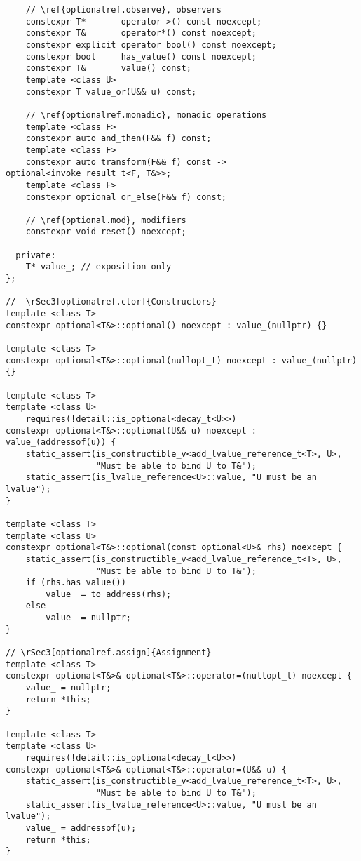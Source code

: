 \documentclass[a4paper,10pt,oneside,openany,final,article]{memoir}
\begin{document}
\begin{verbatim}
    // \ref{optionalref.observe}, observers
    constexpr T*       operator->() const noexcept;
    constexpr T&       operator*() const noexcept;
    constexpr explicit operator bool() const noexcept;
    constexpr bool     has_value() const noexcept;
    constexpr T&       value() const;
    template <class U>
    constexpr T value_or(U&& u) const;

    // \ref{optionalref.monadic}, monadic operations
    template <class F>
    constexpr auto and_then(F&& f) const;
    template <class F>
    constexpr auto transform(F&& f) const -> optional<invoke_result_t<F, T&>>;
    template <class F>
    constexpr optional or_else(F&& f) const;

    // \ref{optional.mod}, modifiers
    constexpr void reset() noexcept;

  private:
    T* value_; // exposition only
};

//  \rSec3[optionalref.ctor]{Constructors}
template <class T>
constexpr optional<T&>::optional() noexcept : value_(nullptr) {}

template <class T>
constexpr optional<T&>::optional(nullopt_t) noexcept : value_(nullptr) {}

template <class T>
template <class U>
    requires(!detail::is_optional<decay_t<U>>)
constexpr optional<T&>::optional(U&& u) noexcept : value_(addressof(u)) {
    static_assert(is_constructible_v<add_lvalue_reference_t<T>, U>,
                  "Must be able to bind U to T&");
    static_assert(is_lvalue_reference<U>::value, "U must be an lvalue");
}

template <class T>
template <class U>
constexpr optional<T&>::optional(const optional<U>& rhs) noexcept {
    static_assert(is_constructible_v<add_lvalue_reference_t<T>, U>,
                  "Must be able to bind U to T&");
    if (rhs.has_value())
        value_ = to_address(rhs);
    else
        value_ = nullptr;
}

// \rSec3[optionalref.assign]{Assignment}
template <class T>
constexpr optional<T&>& optional<T&>::operator=(nullopt_t) noexcept {
    value_ = nullptr;
    return *this;
}

template <class T>
template <class U>
    requires(!detail::is_optional<decay_t<U>>)
constexpr optional<T&>& optional<T&>::operator=(U&& u) {
    static_assert(is_constructible_v<add_lvalue_reference_t<T>, U>,
                  "Must be able to bind U to T&");
    static_assert(is_lvalue_reference<U>::value, "U must be an lvalue");
    value_ = addressof(u);
    return *this;
}


\end{verbatim}
\end{document}
